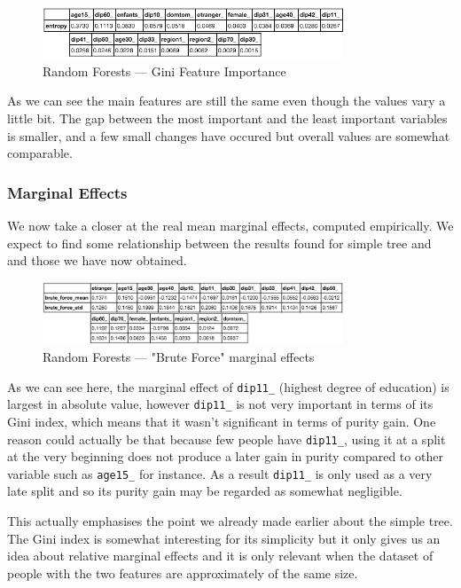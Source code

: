 \begin{figure}
    \centering
    \includegraphics[width=0.8\textwidth]{img/random_forest_gini.png}
    \caption{Random Forests --- Gini Feature Importance}
    \label{fig:random_forest_gini}
\end{figure}

As we can see the main features are still the same even though the values vary a little bit. The gap between the most important and the least important variables is smaller, and a few small changes have occured but overall values are somewhat comparable.

\subsubsection{Marginal Effects}

We now take a closer at the real mean marginal effects, computed empirically. We expect to find some relationship between the results found for simple tree and and those we have now obtained.

\begin{figure}
    \centering
    \includegraphics[width=0.8\textwidth]{img/random_forest_brute_force.png}
    \caption{Random Forests --- "Brute Force" marginal effects}
    \label{fig:random_forest_brute_force}
\end{figure}

As we can see here, the marginal effect of \texttt{dip11\_} (highest degree of education) is largest in absolute value, however \texttt{dip11\_} is not very important in terms of its Gini index, which means that it wasn't significant in terms of purity gain. One reason could actually be that because few people have \texttt{dip11\_}, using it at a split at the very beginning does not produce a later gain in purity compared to other variable such as \texttt{age15\_} for instance. As a result \texttt{dip11\_} is only used as a very late split and so its purity gain may be regarded as somewhat negligible.

This actually emphasises the point we already made earlier about the simple tree. The Gini index is somewhat interesting for its simplicity but it only gives us an idea about relative marginal effects and it is only relevant when the dataset of people with the two features are approximately of the same size.

